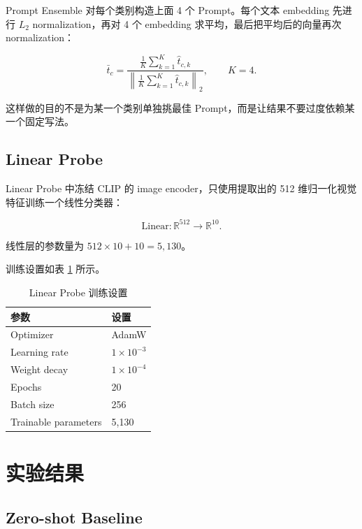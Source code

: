\documentclass[UTF8,11pt,a4paper]{ctexart}
\begin{document}
Prompt Ensemble 对每个类别构造上面 4 个 Prompt。每个文本 embedding 先进行 $L_2$ normalization，再对 4 个 embedding 求平均，最后把平均后的向量再次 normalization：

\begin{equation}
\bar{t}_c =
\frac{
\frac{1}{K}\sum_{k=1}^{K}\hat{t}_{c,k}
}{
\left\|
\frac{1}{K}\sum_{k=1}^{K}\hat{t}_{c,k}
\right\|_2
},
\qquad K=4.
\end{equation}

这样做的目的不是为某一个类别单独挑最佳 Prompt，而是让结果不要过度依赖某一个固定写法。

\subsection{Linear Probe}

Linear Probe 中冻结 CLIP 的 image encoder，只使用提取出的 512 维归一化视觉特征训练一个线性分类器：

\begin{equation}
\text{Linear}: \mathbb{R}^{512}\rightarrow\mathbb{R}^{10}.
\end{equation}

线性层的参数量为 $512\times10+10=5,130$。

训练设置如表 \ref{tab:lp_setting} 所示。

\begin{table}[H]
\centering
\caption{Linear Probe 训练设置}
\label{tab:lp_setting}
\begin{tabular}{ll}
\toprule
参数 & 设置 \\
\midrule
Optimizer & AdamW \\
Learning rate & $1\times 10^{-3}$ \\
Weight decay & $1\times 10^{-4}$ \\
Epochs & 20 \\
Batch size & 256 \\
Trainable parameters & 5,130 \\
\bottomrule
\end{tabular}
\end{table}

\section{实验结果}

\subsection{Zero-shot Baseline}
\end{document}
